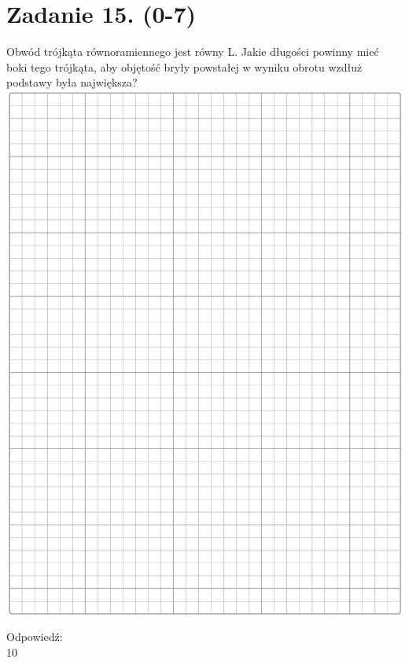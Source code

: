 \documentclass[10pt]{article}
\begin{document}
\section*{Zadanie 15. (0-7)}
Obwód trójkąta równoramiennego jest równy L. Jakie długości powinny mieć boki tego trójkąta, aby objętość bryły powstałej w wyniku obrotu wzdłuż podstawy była największa?\\
\includegraphics[max width=\textwidth, center]{2024_11_21_599d917d55a506aace4bg-10}

Odpowiedź:\\
10
\end{document}
